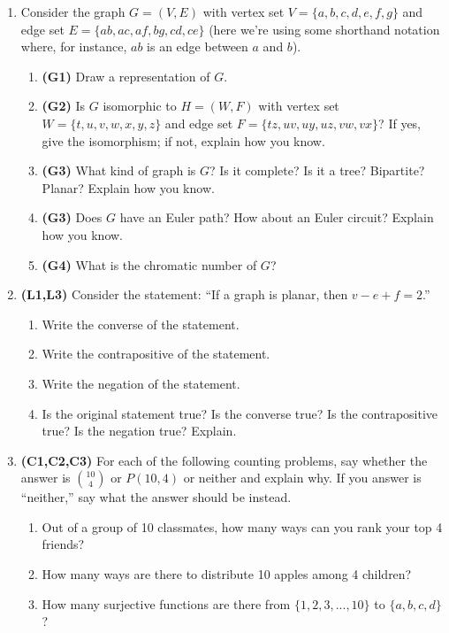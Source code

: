 \documentclass[12pt]{article}
\begin{document}
\begin{enumerate}
\item Consider the graph $G = (V, E)$ with vertex set $V = \{a,b,c,d,e,f,g\}$ and edge set $E = \{ab, ac, af, bg, cd, ce\}$ (here we're using some shorthand notation where, for instance, $ab$ is an edge between $a$ and $b$).

\begin{enumerate}
    \item \textbf{(G1)} Draw a representation of $G$.
    \item \textbf{(G2)} Is $G$ isomorphic to $H = (W, F)$ with vertex set $W = \{t, u, v, w, x, y, z\}$ and edge set $F = \{tz, uv, uy, uz, vw, vx\}$? If yes, give the isomorphism; if not, explain how you know.
    \item \textbf{(G3)} What kind of graph is $G$? Is it complete? Is it a tree? Bipartite? Planar? Explain how you know.
    \item \textbf{(G3)} Does $G$ have an Euler path? How about an Euler circuit? Explain how you know.
    \item \textbf{(G4)} What is the chromatic number of $G$?
\end{enumerate}

\item \textbf{(L1,L3)} Consider the statement: ``If a graph is planar, then $v-e+f=2$.''
\begin{enumerate}
    \item Write the converse of the statement.
    \item Write the contrapositive of the statement.
    \item Write the negation of the statement.
    \item Is the original statement true? Is the converse true? Is the contrapositive true? Is the negation true? Explain.
\end{enumerate}

\item \textbf{(C1,C2,C3)} For each of the following counting problems, say whether the answer is $\binom{10}{4}$ or $P(10,4)$ or neither and explain why. If you answer is “neither,” say what the answer should be instead.

\begin{enumerate}
    \item Out of a group of 10 classmates, how many ways can you rank your top 4 friends?
    \item How many ways are there to distribute 10 apples among 4 children?
    \item How many surjective functions are there from $\{1,2,3,...,10\}$ to $\{a,b,c,d\}$?
\end{enumerate}


\end{enumerate}
\end{document}
